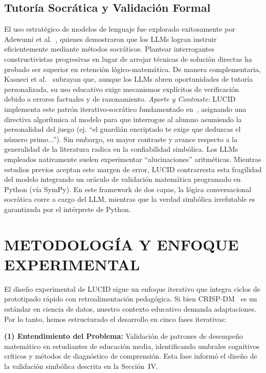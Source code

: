 \documentclass{ieeetj}
\begin{document}
\subsection{Tutor\'ia Socr\'atica y Validaci\'on Formal}
El uso estrat\'egico de modelos de lenguaje fue explorado exitosamente por Adewumi et al.~\cite{adewumi2025findings},
quienes demostraron que los LLMs logran instruir eficientemente mediante m\'etodos socr\'aticos. Plantear
interrogantes constructivistas progresivas en lugar de arrojar t\'ecnicas de soluci\'on directas ha probado
ser superior en retenci\'on l\'ogico-matem\'atica. De manera complementaria, Kasneci et al.~\cite{kasneci2023chatgpt}
subrayan que, aunque los LLMs abren oportunidades de tutor\'ia personalizada, su uso educativo
exige mecanismos expl\'icitos de verificaci\'on debido a errores factuales y de razonamiento.
\textit{Aporte y Contraste:} LUCID implementa este patr\'on iterativo-socr\'atico fundamentado en~\cite{adewumi2025findings},
asignando una directiva algor\'itmica al modelo para que interrogue al alumno asumiendo la personalidad del juego
(ej. ``el guardi\'an encriptado te exige que deduzcas el n\'umero primo...''). Sin embargo,
su mayor contraste y avance respecto a la generalidad de la literatura radica en la confiabilidad
simb\'olica. Los LLMs empleados nativamente suelen experimentar ``alucinaciones'' aritm\'eticas. Mientras 
estudios previos aceptan este margen de error, LUCID contrarresta esta fragilidad del modelo integrando 
un or\'aculo de validaci\'on matem\'atica programado en Python (v\'ia SymPy). En este framework de dos capas, 
la l\'ogica conversacional socr\'atica corre a cargo del LLM, mientras que la verdad simb\'olica irrefutable
es garantizada por el int\'erprete de Python.

\section{METODOLOG\'IA Y ENFOQUE EXPERIMENTAL}
El dise\~no experimental de LUCID sigue un enfoque iterativo que integra ciclos de prototipado r\'apido con retroalimentaci\'on pedag\'ogica.
Si bien CRISP-DM~\cite{zawacki2019systematic} es un est\'andar en ciencia de datos, nuestro contexto educativo demanda adaptaciones.
Por lo tanto, hemos estructurado el desarrollo en cinco fases iterativas:

\textbf{(1) Entendimiento del Problema:} Validaci\'on de patrones de desempe\~no matem\'atico en estudiantes de educaci\'on media,
identificando umbrales cognitivos cr\'iticos y m\'etodos de diagn\'ostico de comprensi\'on.
Esta fase inform\'o el dise\~no de la validaci\'on simb\'olica descrita en la Secci\'on~IV.
\end{document}
